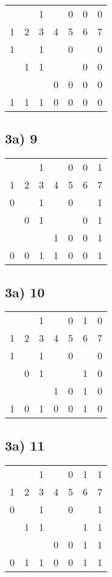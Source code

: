 \documentclass[]{article}
\begin{document}
\begin{longtable}[l]{@{}lllllll@{}}
	\toprule
	 & &1& &0&0&0\\
	1&2&3&4&5&6&7\\
	\endhead
	\midrule
	1& &1& &0& &0\\
	 &1&1& & &0&0\\
	 & & &0&0&0&0\\
	\hline
	1&1&1&0&0&0&0\\
	\bottomrule
\end{longtable}

\subsection{3a) 9}

\begin{longtable}[l]{@{}lllllll@{}}
	\toprule
	 & &1& &0&0&1\\
	1&2&3&4&5&6&7\\
	\endhead
	\midrule
	0& &1& &0& &1\\
	 &0&1& & &0&1\\
	 & & &1&0&0&1\\
	\hline
	0&0&1&1&0&0&1\\
	\bottomrule
\end{longtable}

\subsection{3a) 10}

\begin{longtable}[l]{@{}lllllll@{}}
	\toprule
	 & &1& &0&1&0\\
	1&2&3&4&5&6&7\\
	\endhead
	\midrule
	1& &1& &0& &0\\
	 &0&1& & &1&0\\
	 & & &1&0&1&0\\
	\hline
	1&0&1&0&0&1&0\\
	\bottomrule
\end{longtable}

\subsection{3a) 11}

\begin{longtable}[l]{@{}lllllll@{}}
	\toprule
	 & &1& &0&1&1\\
	1&2&3&4&5&6&7\\
	\endhead
	\midrule
	0& &1& &0& &1\\
	 &1&1& & &1&1\\
	 & & &0&0&1&1\\
	\hline
	0&1&1&0&0&1&1\\
	\bottomrule
\end{longtable}
\end{document}
